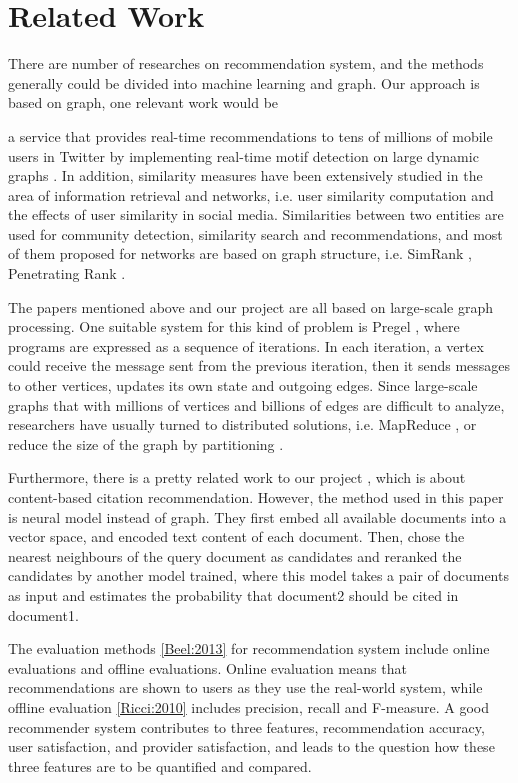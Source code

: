 \section{Related Work}

There are number of researches on recommendation system, and the methods generally could be divided into machine learning and graph. Our approach is based on graph, one relevant work would be 

a service that provides real-time recommendations to tens of millions of mobile users in Twitter by implementing real-time motif detection on large dynamic graphs \cite{Gupta:2014}. In addition, similarity measures \cite{Goel2013} have been extensively studied in the area of information retrieval and networks, i.e. user similarity computation and the effects of user similarity in social media. Similarities between two entities are used for community detection, similarity search and recommendations, and most of them proposed for networks are based on graph structure, i.e. SimRank \cite{Jeh:2002}, Penetrating Rank \cite{Zhao:2009}. 

The papers mentioned above and our project are all based on large-scale graph processing. One suitable system for this kind of problem is Pregel \cite{Malewicz:2010}, where programs are expressed as a sequence of iterations. In each iteration, a vertex could receive the message sent from the previous iteration, then it sends messages to other vertices, updates its own state and outgoing edges. Since large-scale graphs that with millions of vertices and billions of edges are difficult to analyze, researchers have usually turned to distributed solutions, i.e. MapReduce \cite{Lin:2010}, or reduce the size of the graph by partitioning \cite{Karypis:1998}.

Furthermore, there is a pretty related work to our project \cite{DBLP}, which is about content-based citation recommendation. However, the method used in this paper is neural model instead of graph. They first embed all available documents into a vector space, and encoded text content of each document. Then, chose the nearest neighbours of the query document as candidates and reranked the candidates by another model trained, where this model takes a pair of documents as input and estimates the probability that document2 should be cited in document1.

The evaluation methods \ref{Beel:2013} for recommendation system include online evaluations and offline evaluations. Online evaluation means that recommendations are shown to users as they use the real-world system, while offline evaluation \ref{Ricci:2010} includes precision, recall and F-measure. A good recommender system contributes to three features, recommendation accuracy, user satisfaction, and provider satisfaction, and leads to the question how these three features are to be quantified and compared.

